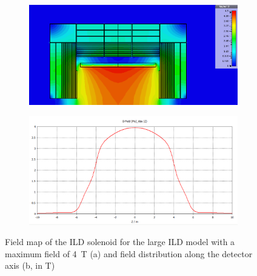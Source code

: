 \begin{figure}[t]
\begin{center}
\begin{subfigure}{0.9\hsize} \includegraphics[width=\textwidth]{Integration/fig/field_nominal_4.png}
\caption{ \label{ild:fig:magnet_nominal_map}}
 \end{subfigure}
\hspace{0.03\textwidth}
\begin{subfigure}{0.9\hsize} \includegraphics[width=\textwidth]{Integration/fig/field_nominal_4_plot.png}
\caption{  \label{ild:fig:magnet_nominal_field}}
 \end{subfigure}
\end{center}
\caption{Field map of the ILD solenoid for the large ILD model with a maximum field of 4~T (a) and field distribution along the detector axis (b, in T)~\cite{ild:bib:Magnet_Simulations}}
\label{ILD:fig:magnet_nominal}
\end{figure}

